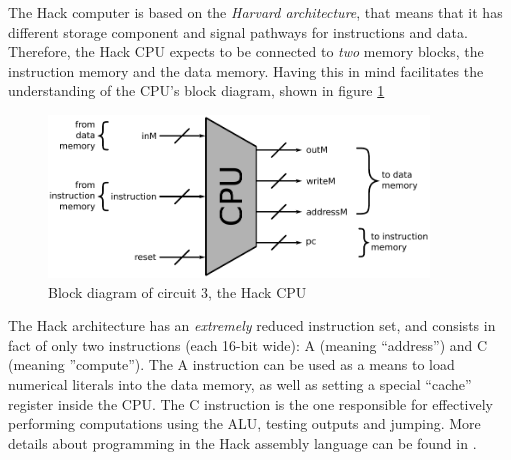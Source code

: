 \documentclass[a4paper]{article}
\begin{document}
            The Hack computer is based on the \emph{Harvard architecture}, that means that it has
            different storage component and signal pathways for instructions and data. Therefore,
            the Hack CPU expects to be connected to \emph{two} memory blocks, the instruction memory
            and the data memory. Having this in mind facilitates the understanding of the CPU's
            block diagram, shown in figure \ref{fig:cpu-block}
            \begin{figure}[h]
                \begin{center}
                    \includegraphics[width=0.9\textwidth]{imgs/cpu-block.pdf}
                \end{center}
                \caption{Block diagram of circuit 3, the Hack CPU
                    \label{fig:cpu-block}}
            \end{figure}

            The Hack architecture has an \emph{extremely} reduced instruction set, and consists in
            fact of only two instructions (each 16-bit wide): A (meaning ``address'') and
            C (meaning ''compute''). The A instruction can be used as a means to load numerical
            literals into the data memory, as well as setting a special ``cache'' register inside
            the CPU. The C instruction is the one responsible for effectively performing
            computations using the ALU, testing outputs and jumping. More details about programming
            in the Hack assembly language can be found in \cite{nand2tetris-book}.
\end{document}
